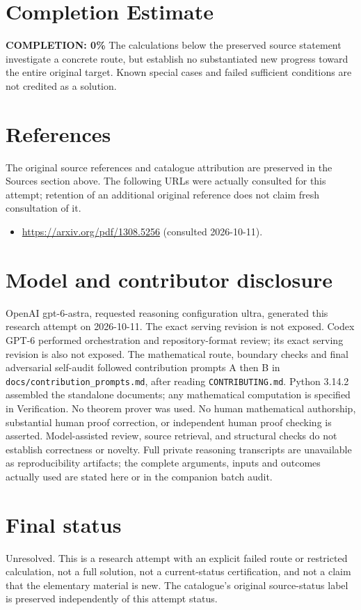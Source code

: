 \documentclass[11pt]{article}
\begin{document}
\section{Completion Estimate}
\noindent\textbf{COMPLETION: 0\%}
The calculations below the preserved source statement investigate a concrete route,
but establish no substantiated new progress toward the entire original target.
Known special cases and failed sufficient conditions are not credited as a solution.
\section{References}
The original source references and catalogue attribution are preserved in the
Sources section above. The following URLs were actually consulted for this attempt;
retention of an additional original reference does not claim fresh consultation of it.
\begin{itemize}
\item \url{https://arxiv.org/pdf/1308.5256} (consulted 2026-10-11). 
\end{itemize}
\section{Model and contributor disclosure}
OpenAI gpt-6-astra, requested reasoning configuration ultra, generated this research
attempt on 2026-10-11. The exact serving revision is not exposed. Codex GPT-6
performed orchestration and repository-format review; its exact serving revision
is also not exposed. The mathematical route, boundary checks and final adversarial
self-audit followed contribution prompts A then B in
\texttt{docs/contribution\_prompts.md}, after reading \texttt{CONTRIBUTING.md}.
Python 3.14.2 assembled the standalone documents; any mathematical computation is
specified in Verification. No theorem prover was used. No human mathematical
authorship, substantial human proof correction, or independent human proof checking
is asserted. Model-assisted review, source retrieval, and structural checks do not
establish correctness or novelty. Full private reasoning transcripts are unavailable
as reproducibility artifacts; the complete arguments, inputs and outcomes actually
used are stated here or in the companion batch audit.
\section{Final status}
Unresolved. This is a research attempt with an explicit failed route or restricted
calculation, not a full solution, not a current-status certification, and not a claim
that the elementary material is new. The catalogue's original source-status label
is preserved independently of this attempt status.
\end{document}
